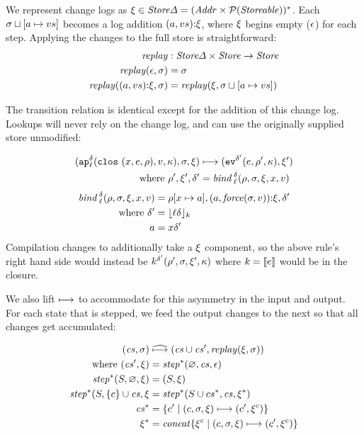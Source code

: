 \documentclass[preprint,onecolumn,9pt]{sigplanconf} %
\begin{document}
We represent change logs as $\msdiff \in \StoreDelta = (\Addr \times
  \Set(\Storeable))^*$. Each $\msto\sqcup[\maddr \mapsto \mval{s}]$
 becomes a log addition
$\cons{\ttuple{\maddr}{\mval{s}}}{\msdiff}$, where $\msdiff$ begins
empty ($\mtlst$) for each step. Applying the changes to the full store
is straightforward:
\begin{align*}
\replay &: \StoreDelta \times \Store \to \Store \\
\replay(\mtlst, \msto) &= \msto \\
\replay(\cons{\ttuple{\maddr}{\mval{s}}}{\msdiff}, \msto) &= \replay(\msdiff, \msto\sqcup[\maddr \mapsto \mval{s}])
\end{align*}

The transition relation is identical except for the addition of this change log.
%
Lookups will never rely on the change log, and can use the originally supplied store unmodified:

\begin{align*}
(\ap[^\mcntr_\mlab]{\clos{\mvar,\mexp,\menv},\mval,\mkont},\msto,\msdiff) & \machstep
(\ev[^{\mcntr'}]{\mexp,\menv',\mkont},\msdiff') \\
\text{ where }\menv',\msdiff',\mcntr' &= \mathit{bind\,}^{ \mcntr}_\mlab(\menv,\msto,\msdiff,\mvar,\mval)
\end{align*}
\begin{align*}
\mathit{bind\,}^{\mcntr}_\mlab(\menv, \msto, \msdiff, \mvar, \mval) &= \menv[\mvar \mapsto \maddr], \cons{\ttuple{\maddr}{\force(\msto,\mval)}}{\msdiff}, \mcntr' \\
\text{ where } \mcntr' &= \lfloor \mlab \mcntr\rfloor_k \\
               \maddr &= \mvar\mcntr'
\end{align*}
Compilation changes to additionally take a $\msdiff$ component, so the
above rule's right hand side would instead be $k^{\mcntr'}(\menv',
\msto, \msdiff', \mkont)$ where $k = \compile{e}$ would be in the closure.

We also lift $\machstep$ to accommodate for this asymmetry
in the input and output. For each state that is stepped, we feed the
output changes to the next so that all changes get accumulated:

\begin{align*}
(\states, \msto) &\mathrel{\widehat{\machstep}} (\states\cup \states', \replay(\msdiff,\msto)) \\
\mbox{ where } (\states', \msdiff) &= \step^*(\varnothing, \states, \mtlst) \\
\step^*(S, \varnothing, \msdiff) &= (S, \msdiff) \\
\step^*(S, \{c\}\cup \states, \msdiff &= \step^*(S\cup cs^*, \states, \msdiff^*) \\
\states^* &= \{c' \mid (c,\msto,\msdiff) \machstep (c',\msdiff^c) \} \\
\msdiff^* &= \concat\{\msdiff^c \mid (c, \msto,\msdiff) \machstep (c', \msdiff^c)\}
\end{align*}
\end{document}
